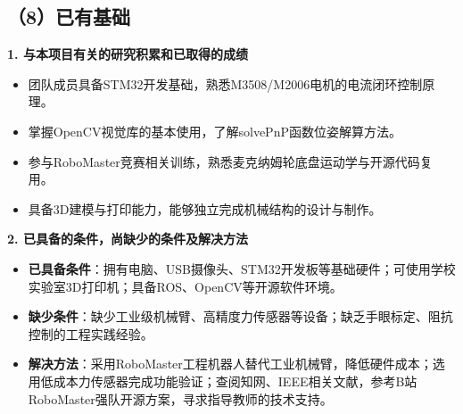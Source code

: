\documentclass[a4paper,12pt]{ctexart}
\begin{document}
\subsection*{（8）已有基础}
\textbf{1. 与本项目有关的研究积累和已取得的成绩}
\begin{itemize}
    \item 团队成员具备STM32开发基础，熟悉M3508/M2006电机的电流闭环控制原理。
    \item 掌握OpenCV视觉库的基本使用，了解solvePnP函数位姿解算方法。
    \item 参与RoboMaster竞赛相关训练，熟悉麦克纳姆轮底盘运动学与开源代码复用。
    \item 具备3D建模与打印能力，能够独立完成机械结构的设计与制作。
\end{itemize}

\textbf{2. 已具备的条件，尚缺少的条件及解决方法}
\begin{itemize}
    \item \textbf{已具备条件}：拥有电脑、USB摄像头、STM32开发板等基础硬件；可使用学校实验室3D打印机；具备ROS、OpenCV等开源软件环境。
    \item \textbf{缺少条件}：缺少工业级机械臂、高精度力传感器等设备；缺乏手眼标定、阻抗控制的工程实践经验。
    \item \textbf{解决方法}：采用RoboMaster工程机器人替代工业机械臂，降低硬件成本；选用低成本力传感器完成功能验证；查阅知网、IEEE相关文献，参考B站RoboMaster强队开源方案，寻求指导教师的技术支持。
\end{itemize}

\clearpage

\end{document}
